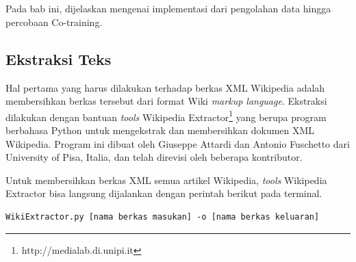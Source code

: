 \chapter{\babEmpat} \label{implementasi}
Pada bab ini, dijelaskan mengenai implementasi dari pengolahan data hingga percobaan Co-training.

\section{Ekstraksi Teks}
Hal pertama yang harus dilakukan terhadap berkas XML Wikipedia adalah membersihkan berkas tersebut dari format Wiki \textit{markup language}. Ekstraksi dilakukan dengan bantuan \textit{tools} Wikipedia Extractor\footnote{http://medialab.di.unipi.it} yang berupa program berbahasa Python untuk mengekstrak dan membersihkan dokumen XML Wikipedia. Program ini dibuat oleh Giuseppe Attardi dan Antonio Fuschetto dari University of Pisa, Italia, dan telah direvisi oleh beberapa kontributor. 

Untuk membersihkan berkas XML semua artikel Wikipedia, \textit{tools} Wikipedia Extractor bisa langsung dijalankan dengan perintah berikut pada terminal.

\begin{lstlisting}
WikiExtractor.py [nama berkas masukan] -o [nama berkas keluaran]
\end{lstlisting}

